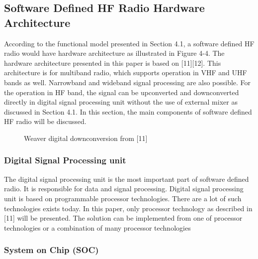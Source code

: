 \documentclass[conference]{IEEEtran}
\begin{document}
\subsection{Software Defined HF Radio Hardware Architecture }
According to the functional model presented in Section 4.1, a software defined HF radio would have hardware architecture as illustrated in Figure 4-4. The hardware architecture presented in this paper is based on [11][12]. This architecture is for multiband radio, which supports operation in VHF and UHF bands as well. Narrowband and wideband signal processing are also possible. For the operation in HF band, the signal can be upconverted and downconverted directly in digital signal processing unit without the use of external mixer as discussed in Section 4.1. In this section, the main components of software defined HF radio will be discussed.
\begin{figure}[h!]
	\centering
	\caption{Weaver digital downconversion from [11]}
	\label{fig:downconversion}
\end{figure} 
\subsubsection{Digital Signal Processing unit}
The digital signal processing unit is the most important part of software defined radio. It is responsible for data and signal processing. Digital signal processing unit is based on programmable processor technologies. There are a lot of such technologies exists today. In this paper, only processor technology as described in [11] will be presented. The solution can be implemented from one of processor technologies or a combination of many processor technologies 
\subsubsection{System on Chip (SOC)}
\end{document}
